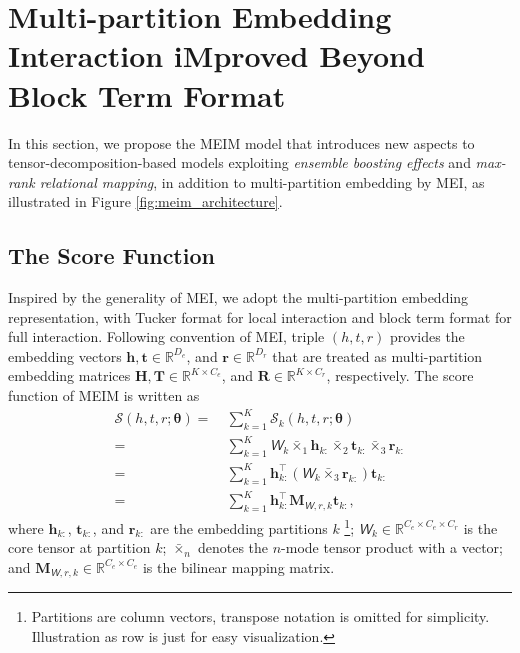 \documentclass{article}
\def\vh{{\bm{h}}}
\def\vr{{\bm{r}}}
\def\vt{{\bm{t}}}
\def\mH{{\bm{H}}}
\def\mM{{\bm{M}}}
\def\mR{{\bm{R}}}
\def\mT{{\bm{T}}}
\newcommand{\tens}[1]{\bm{\mathsfit{#1}}}
\def\tW{{\tens{W}}}
\def\gS{{\mathcal{S}}}
\def\sR{{\mathbb{R}}}
\theoremstyle{plain}
\theoremstyle{remark}
\begin{document}
\section{Multi-partition Embedding Interaction iMproved Beyond Block Term Format} \label{sect:model_instance} In this section, we propose the MEIM model that introduces new aspects to tensor-decomposition-based models exploiting \textit{ensemble boosting effects} and \textit{max-rank relational mapping}, in addition to multi-partition embedding by MEI, as illustrated in Figure \ref{fig:meim_architecture}.

\subsection{The Score Function} \label{sect:model_blockterm} Inspired by the generality of MEI, we adopt the multi-partition embedding representation, with Tucker format \cite{tucker_mathematicalnotesthreemode_1966} for local interaction and block term format \cite{delathauwer_decompositionshigherordertensor_2008a} for full interaction. Following convention of MEI, triple $ (h, t, r) $ provides the embedding vectors $ \vh, \vt \in \sR^{D_e} $, and $ \vr \in \sR^{D_r} $ that are treated as multi-partition embedding matrices $ \mH, \mT \in \sR^{K \times C_e} $, and $ \mR \in \sR^{K \times C_r} $, respectively. The score function of MEIM is written as
\begin{align}
\gS (h,t,r;\bm{\theta}) =\ &\textstyle\sum_{k = 1}^{K} \gS_k (h,t,r;\bm{\theta}) \label{eq:scoremeiblockterm}\\
=\ &\textstyle\sum_{k = 1}^{K} \tW_k \bar{\times}_1 \vh_{k:} \bar{\times}_2 \vt_{k:} \bar{\times}_3 \vr_{k:} \label{eq:scoremeitensorproduct}\\
=\ &\textstyle\sum_{k = 1}^{K} \vh_{k:}^\top (\tW_k \bar{\times}_3 \vr_{k:}) \vt_{k:}\\
=\ &\textstyle\sum_{k = 1}^{K} \vh_{k:}^\top \mM_{\tW, r, k} \vt_{k:}, \label{eq:scoremeibilinear}
\end{align}
where $ \vh_{k:} $, $ \vt_{k:} $, and $ \vr_{k:} $ are the embedding partitions $ k $ \footnote{Partitions are column vectors, transpose notation is omitted for simplicity. Illustration as row is just for easy visualization.}; $ \tW_k \in \sR^{C_e \times C_e \times C_r} $ is the core tensor at partition $ k $; $ \bar{\times}_n $ denotes the $ n $-mode tensor product with a vector; and $ \mM_{\tW, r, k} \in \sR^{C_e \times C_e} $ is the bilinear mapping matrix. 
\end{document}
